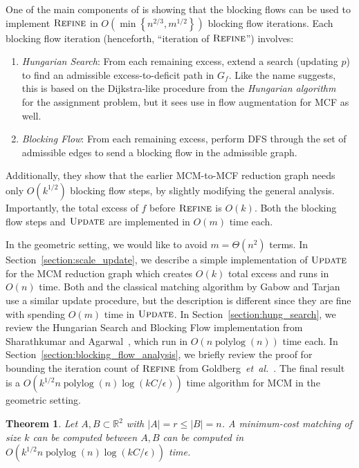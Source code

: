 \documentclass[11pt]{article}
\def\etal{\textsl{et~al.}}
\def\polylog{\mathop{\mathrm{polylog}}}
\def\Refine{\textsc{Refine}}
\def\Update{\textsc{Update}}
\theoremstyle{plain}
\newtheorem{theorem}{Theorem}
\begin{document}
One of the main components of \cite{DBLP:journals/mst/GoldbergHKT17} is showing that the 
blocking flows can be used to implement $\Refine$ in 
$O(\min\left\{n^{2/3}, m^{1/2}\right\})$ blocking flow iterations.
Each blocking flow iteration (henceforth, ``iteration of $\Refine$'') involves:
\begin{enumerate}
\item \emph{Hungarian Search}: From each remaining excess, extend a search (updating $p$) 
	to find an admissible excess-to-deficit path in $G_f$.
	Like the name suggests, this is based on the Dijkstra-like procedure from the
	\emph{Hungarian algorithm}~\cite{kuhn1955hungarian} for the assignment problem,
	but it sees use in flow augmentation for MCF as well.
\item \emph{Blocking Flow}: From each remaining excess, perform DFS through the set of 
	admissible edges to send a blocking flow in the admissible graph.
\end{enumerate}
Additionally, they show that the earlier MCM-to-MCF reduction graph needs only 
$O(k^{1/2})$ blocking flow steps, by slightly modifying the general analysis.
Importantly, the total excess of $f$ before $\Refine$ is $O(k)$.
Both the blocking flow steps and $\Update$ are implemented in $O(m)$ time each.

In the geometric setting, we would like to avoid $m = \Theta(n^2)$ terms.
In Section~\ref{section:scale_update}, 
we describe a simple implementation of $\Update$ for the 
MCM reduction graph which creates $O(k)$ total excess and runs in $O(n)$ time.
Both \cite{DBLP:journals/mst/GoldbergHKT17} and the classical matching algorithm 
by Gabow and Tarjan~\cite{DBLP:journals/siamcomp/GabowT89}
use a similar update procedure, but the description is different since they
are fine with spending $O(m)$ time in $\Update$.
In Section~\ref{section:hung_search}, 
we review the Hungarian Search and Blocking Flow
implementation from Sharathkumar and Agarwal~\cite{DBLP:conf/soda/SharathkumarA12},
which run in $O(n\polylog(n))$ time each.
In Section~\ref{section:blocking_flow_analysis}, 
we briefly review the proof for bounding the iteration count of $\Refine$ 
from Goldberg~{\etal}~\cite{DBLP:journals/mst/GoldbergHKT17}.
The final result is a $O(k^{1/2}n\polylog(n)\log(kC/\epsilon))$ 
time algorithm for MCM in the geometric setting.

\begin{theorem}
Let $A, B \subset \mathbb{R}^2$ with $|A| = r \leq |B| = n$.
A minimum-cost matching of size $k$ can be computed between $A, B$
can be computed in $O(k^{1/2}n\polylog(n)\log(kC/\epsilon))$ time.
\end{theorem}
\end{document}
